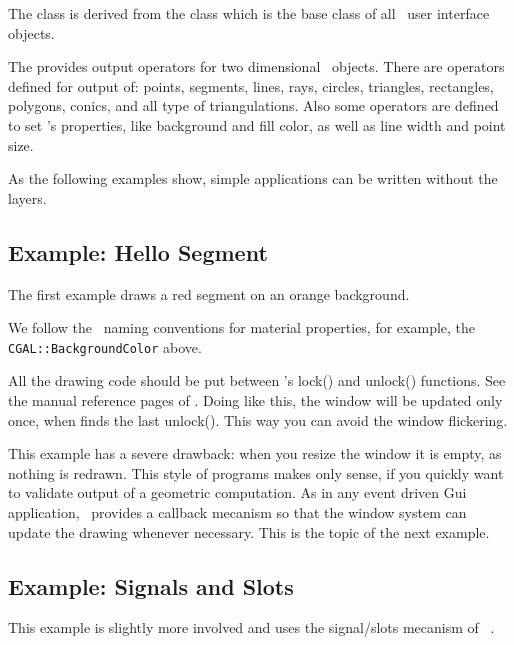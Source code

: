 The class  is derived from the class 
which is the base class of all \qt\ user interface objects. 


The  provides output operators for two dimensional \cgal\
objects. There are operators defined for output of: points, segments, 
lines, rays, circles, triangles, rectangles, polygons, conics,  and all type of
triangulations. Also some operators are defined to set
's properties, like background and fill color, as
well as line width and point size.

As the following examples show, simple applications can be written
without the layers.

\subsection{Example: Hello Segment}
The first example draws a red segment on an orange background.

We follow the \qt\ naming conventions for material properties, for
example, the {\tt CGAL::BackgroundColor} above.

All the drawing code should be put between 's lock() and
unlock() functions. See the manual reference pages of
. Doing like this, the window will be updated only
once, when \ccStyle{Qt\_widget} finds the last unlock(). This way you
can avoid the window flickering.

This example has a severe drawback: when you resize the window it is
empty, as nothing is redrawn. This style of programs makes
only sense, if you quickly want to validate output of a geometric
computation. As in any event driven {\sc Gui} application,
 \qt\  provides a callback mecanism so
that the window system can update the drawing
whenever necessary. This is the topic of the next example.

\subsection{Example: Signals and Slots}

This example is slightly more involved and uses  the
signal/slots mecanism of \qt\ .

